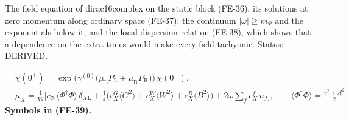 \documentclass[
  10pt,
]{article}
\begin{document}
The field equation of dirac16complex on the static block (FE-36), its
solutions at zero momentum along ordinary space (FE-37): the continuum
\(\lvert\omega\rvert \ge m_\Psi\) and the exponentials below it, and the
local dispersion relation (FE-38), which shows that a dependence on the
extra times would make every field tachyonic. Status: DERIVED.

\[
\begin{aligned}
&\chi(0^+) = \exp\Big(\gamma^{(0)}\big(\mu_{\mathrm{L}}P_{\mathrm{L}} + \mu_{\mathrm{R}}P_{\mathrm{R}}\big)\Big)\,\chi(0^-),\\
&\mu_X = \frac{1}{V_*}\Big[c_\Phi\,\langle\Phi^\dagger\Phi\rangle\,\delta_{X\mathrm{L}} + \frac14\big(c^{G}_X\langle G^2\rangle
 + c^{W}_X\langle W^2\rangle + c^{B}_X\langle B^2\rangle\big) + 2\omega\sum_f c^{f}_X\,n_f\Big],\qquad
 \langle\Phi^\dagger\Phi\rangle = \frac{v^2 + \mathcal{A}^2}{2}
\end{aligned} \tag{FE-39}
\] \textbf{Symbols in (FE-39).}
\end{document}
